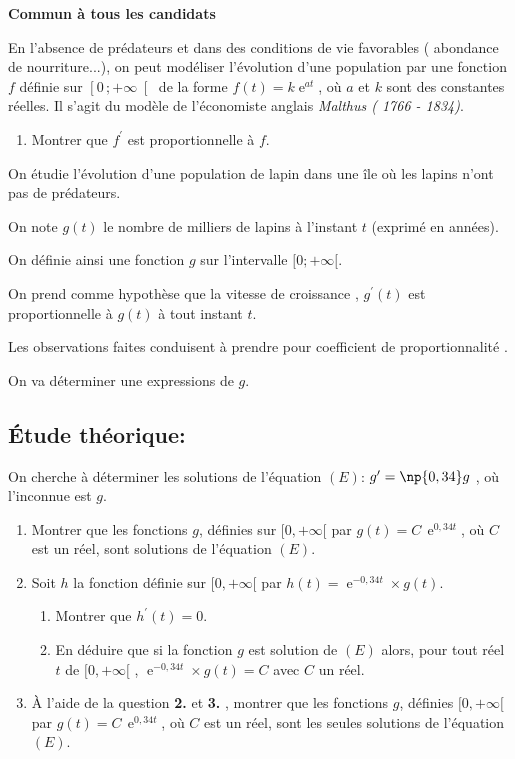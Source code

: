 \documentclass[12pt,a4paper,french]{article}
\DeclareMathOperator{\e}{e}
\newcommand{\brm}[1]{\marginpar{\addpoints{#1}}}%
\begin{document}
\begin{question}
\vspace{-5.8mm}
\begin{center}\textbf{Commun à tous les candidats}\end{center}
En l'absence de prédateurs et dans des conditions de vie favorables ( abondance de nourriture...), on peut modéliser l'évolution d'une population par une fonction $f$ définie sur $\left[  0 \, ; +\infty\right[ $ de la forme $f(t)=k\e^{at}$, où $a$ et $k$ sont des constantes réelles. Il s'agit du modèle de l'économiste anglais \textit{Malthus ( 1766 - 1834)}. 

\begin{enumerate}
\item Montrer que $f^\prime$ est proportionnelle à $f$. \brm{0.5}
\end{enumerate}

On étudie l'évolution d'une population  de lapin dans une île où les lapins n'ont pas de prédateurs.

On note $g(t)$ le nombre de milliers de lapins à l'instant $t$ (exprimé en années). 

On définie ainsi une fonction $g$ sur l'intervalle $[0;+\infty[$.

On prend comme hypothèse que la \og vitesse de croissance \fg, $g^\prime(t)$ est proportionnelle à $g(t)$ à tout instant $t$.

Les observations faites conduisent à prendre pour coefficient de proportionnalité .

On va déterminer une expressions de $g$.

\subsection*{\'Etude théorique:}
On cherche à déterminer les solutions de l'équation $(E)$: $g^\prime =\np{0,34} g$ ,\; où l'inconnue est $g$.
\begin{enumerate}[resume]
\item Montrer que les fonctions $g$, définies sur $[0,+\infty [$ par $g(t)=C\,\e^{0,34t}$, où $C$ est un réel, sont solutions de l'équation $(E)$. \brm{0.5}
\item Soit $h$ la fonction définie sur  $[0,+\infty [$ par $h(t)=\e^{-0,34 t}\times g(t)$.
\begin{enumerate}
\item Montrer que $h^\prime(t)=0$. \brm{0.5}
\item En déduire que si la fonction $g$ est solution de $(E)$ alors, pour tout réel $t$ de  $[0,+\infty [$ , $\e^{-0,34t}\times g(t)=C$ avec $C$ un réel. \brm{1.0}
\end{enumerate}
\item \`A l'aide de la question \textbf{2.} et \textbf{3.} , montrer que les fonctions $g$, définies  $[0,+\infty [$  par $g(t)=C\,\e^{0,34t}$, où $C$ est un réel, sont les seules solutions de l'équation $(E)$. \brm{0.5}
\end{enumerate}


\end{question}
\end{document}
